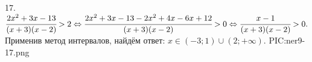 17. $\cfrac{2x^2+3x-13}{(x+3)(x-2)}>2\Leftrightarrow\cfrac{2x^2+3x-13-2x^2+4x-6x+12}{(x+3)(x-2)}>0\Leftrightarrow \cfrac{x-1}{(x+3)(x-2)}>0.$
Применив метод интервалов, найдём ответ: $x\in(-3;1)\cup(2;+\infty).$
{{PIC:ner9-17.png}}\\

